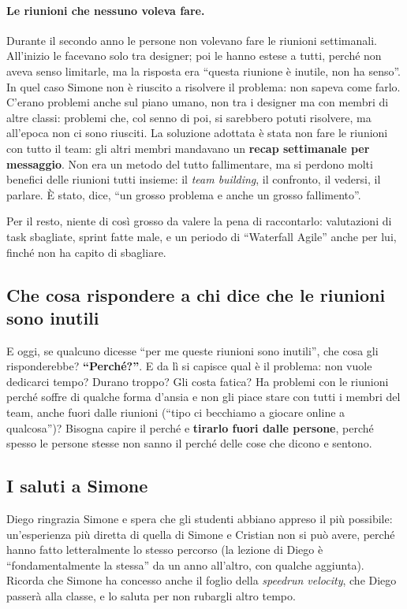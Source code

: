 \paragraph{Le riunioni che nessuno voleva fare.} Durante il secondo anno le
persone non volevano fare le riunioni settimanali. All'inizio le facevano solo
tra designer; poi le hanno estese a tutti, perché non aveva senso limitarle,
ma la risposta era ``questa riunione è inutile, non ha senso''. In quel caso
Simone non è riuscito a risolvere il problema: non sapeva come farlo. C'erano
problemi anche sul piano umano, non tra i designer ma con membri di altre
classi: problemi che, col senno di poi, si sarebbero potuti risolvere, ma
all'epoca non ci sono riusciti. La soluzione adottata è stata non fare le
riunioni con tutto il team: gli altri membri mandavano un \textbf{recap
settimanale per messaggio}. Non era un metodo del tutto fallimentare, ma si
perdono molti benefici delle riunioni tutti insieme: il \emph{team building},
il confronto, il vedersi, il parlare. È stato, dice, ``un grosso problema e
anche un grosso fallimento''.

Per il resto, niente di così grosso da valere la pena di raccontarlo:
valutazioni di task sbagliate, sprint fatte male, e un periodo di
``Waterfall Agile'' anche per lui, finché non ha capito di sbagliare.

\subsection{Che cosa rispondere a chi dice che le riunioni sono inutili}

E oggi, se qualcuno dicesse ``per me queste riunioni sono inutili'', che cosa
gli risponderebbe? \textbf{``Perché?''}. E da lì si capisce qual è il
problema: non vuole dedicarci tempo? Durano troppo? Gli costa fatica? Ha
problemi con le riunioni perché soffre di qualche forma d'ansia e non gli
piace stare con tutti i membri del team, anche fuori dalle riunioni (``tipo
ci becchiamo a giocare online a qualcosa'')? Bisogna capire il perché e
\textbf{tirarlo fuori dalle persone}, perché spesso le persone stesse non sanno
il perché delle cose che dicono e sentono.

\subsection{I saluti a Simone}

Diego ringrazia Simone e spera che gli studenti abbiano appreso il più
possibile: un'esperienza più diretta di quella di Simone e Cristian non si può
avere, perché hanno fatto letteralmente lo stesso percorso (la lezione di
Diego è ``fondamentalmente la stessa'' da un anno all'altro, con qualche
aggiunta). Ricorda che Simone ha concesso anche il foglio della
\emph{speedrun velocity}, che Diego passerà alla classe, e lo saluta per non
rubargli altro tempo.

